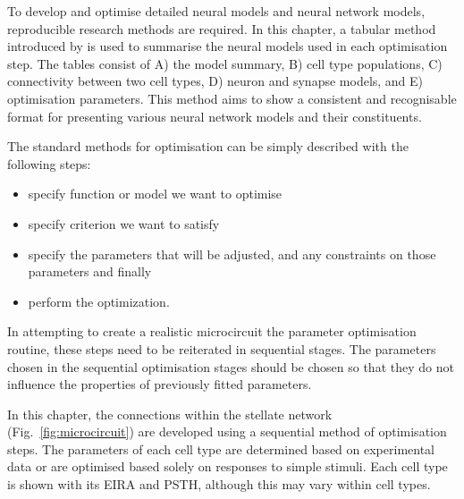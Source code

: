 

To develop and optimise detailed neural models and neural network models,
reproducible research methods are required. In this chapter, a tabular method
introduced by \citet{NordlieGewaltigEtAl:2009} is used to summarise the neural
models used in each optimisation step. The tables consist of A) the model
summary, B) cell type populations, C) connectivity between two cell types, D)
neuron and synapse models, and E) optimisation parameters.  This method aims to
show a consistent and recognisable format for presenting various neural network
models and their constituents. 


The standard methods for optimisation can be simply described with the following
steps:\begin{itemize}
\item specify function or model we want to optimise
\item specify criterion we want to satisfy
\item specify the parameters that will be adjusted, 
  and any constraints on those parameters and finally
\item perform the optimization.
\end{itemize}
In attempting to create a realistic microcircuit the parameter optimisation
routine, these steps need to be reiterated in sequential stages. The parameters
chosen in the sequential optimisation stages should be chosen so that they do
not influence the properties of previously fitted parameters.


In this chapter, the connections within the stellate network
(Fig.~\ref{fig:microcircuit}) are developed using a sequential method of
optimisation steps.  The parameters of each cell type are determined based on
experimental data or are optimised based solely on responses to simple stimuli.
Each cell type is shown with its \gls{EIRA} and \gls{PSTH}, although this may
vary within cell types.


